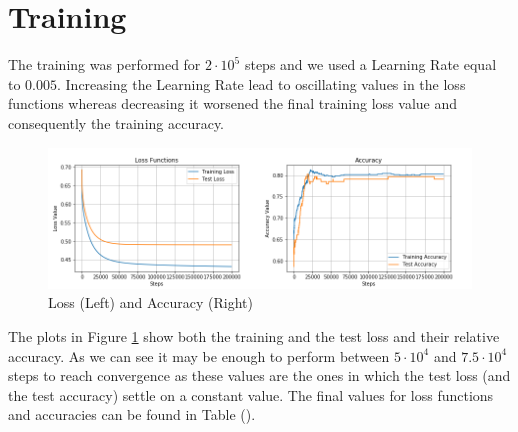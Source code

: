 \documentclass[10pt,a4paper]{report}
\begin{document}
\section{Training}
The training was performed for $2 \cdot 10^5$ steps and we used a Learning Rate equal to $0.005$. Increasing the Learning Rate lead to oscillating values in the loss functions whereas decreasing it worsened the final training loss value and consequently the training accuracy. 
\begin{figure}[!ht]
\centering
\includegraphics[width=\linewidth]{loss_acc.png}
\caption{Loss (Left) and Accuracy (Right)}
\label{fig:loss_acc}
\end{figure}
The plots in Figure \ref{fig:loss_acc} show both the training and the test loss and their relative accuracy. As we can see it may be enough to perform between $5 \cdot 10^4$ and $7.5 \cdot 10^4$ steps to reach convergence as these values are the ones in which the test loss (and the test accuracy) settle on a constant value. The final values for loss functions and accuracies can be found in Table ().
\end{document}
